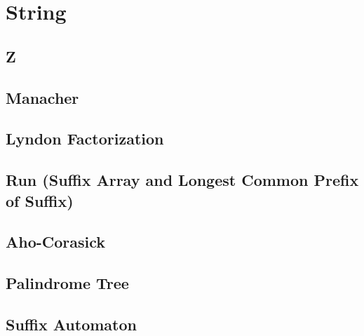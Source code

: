 \section{String}

\subsection{Z}


\subsection{Manacher}


\subsection{Lyndon Factorization}


\subsection{Run (Suffix Array and Longest Common Prefix of Suffix)}


\subsection{Aho-Corasick}


\subsection{Palindrome Tree}


\subsection{Suffix Automaton}
